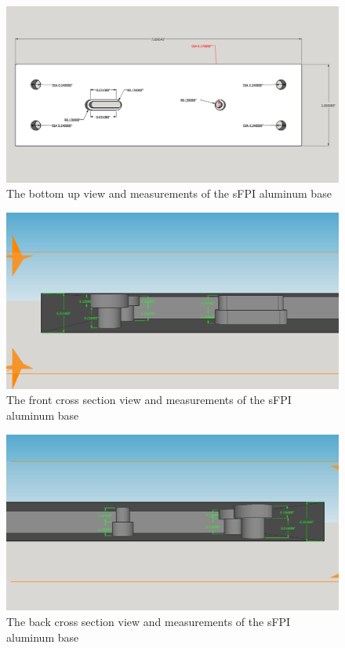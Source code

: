 \documentclass[12pt,journal]{IEEEtran}
\begin{document}
\begin{appendices}
\begin{figure}[h!]
  \centering
	\includegraphics[width=\textwidth]{./mechanical/sfpilensholder_bottom.png}
	\caption[Cavity Mounts]{The bottom up view and measurements of the sFPI aluminum base}
	\label{fig:sfpilensholder-bottom}
\end{figure}  

\begin{figure}[h!]
  \centering
	\includegraphics[width=\textwidth]{./mechanical/sfpilensholder_cross_section_1.png}
	\caption[Cavity Mounts]{The front cross section view and measurements of the sFPI aluminum base}
	\label{fig:sfpilensholder-side}
\end{figure} 

\begin{figure}[h!]
  \centering
	\includegraphics[width=\textwidth]{./mechanical/sfpilensholder_cross_section_2.png}
	\caption[Cavity Mounts]{The back cross section view and measurements of the sFPI aluminum base}
	\label{fig:sfpilensholder-side}
\end{figure}   


\end{appendices}
\end{document}
